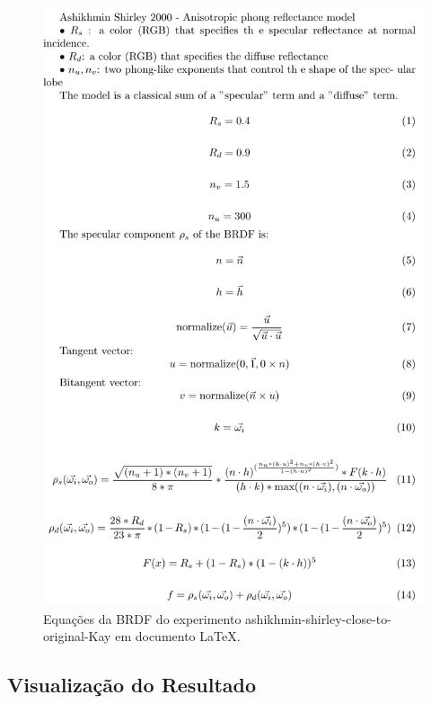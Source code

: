 \begin{figure}[H]
    \caption{\label{fig-ashikhmin-shirley-close-to-original-eqlang-latex} \small Equações da BRDF do experimento ashikhmin-shirley-close-to-original-Kay em documento \LaTeX{}.}
    \begin{center}
        \includegraphics[scale=0.92]{./Imagens/brdfs/ashikhmin-shirley-close-to-original.pdf}
    \end{center}
\end{figure}

\subsection{Visualização do Resultado}

